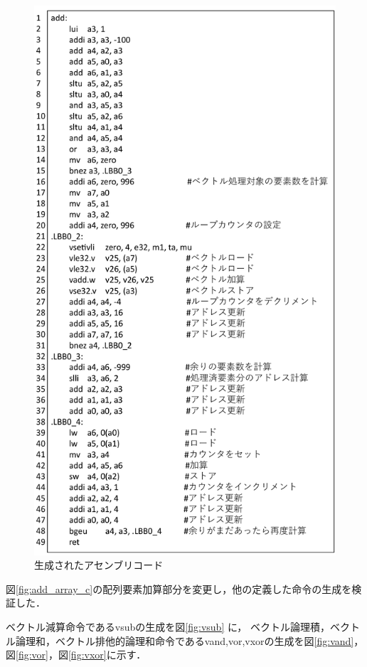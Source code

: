 \begin{figure}
    \centering
    \includegraphics[scale=0.55]{image/rv_vectorized_assembly.pdf}
    \caption{生成されたアセンブリコード}
    \label{fig:rv_vectorized_assembly}
\end{figure}

図\ref{fig:add_array_c}の配列要素加算部分を変更し，他の定義した命令の生成を検証した．

ベクトル減算命令であるvsubの生成を図\ref{fig:vsub}
に，
ベクトル論理積，ベクトル論理和，ベクトル排他的論理和命令であるvand,vor,vxorの生成を図\ref{fig:vand}，図\ref{fig:vor}，図\ref{fig:vxor}に示す．

